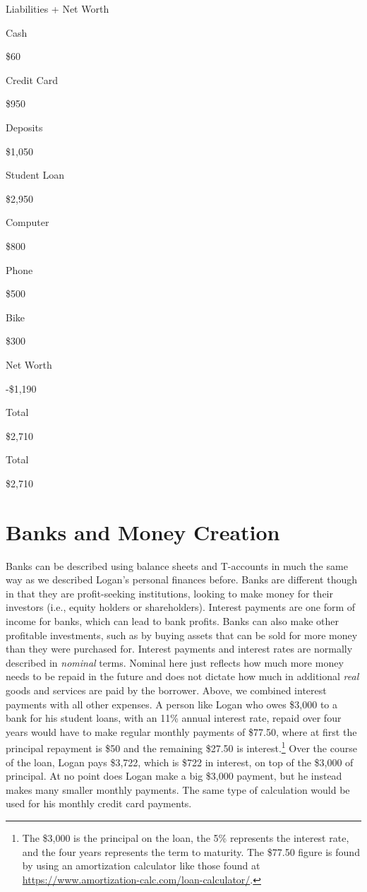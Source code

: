 \documentclass[
]{book}
\begin{document}
Liabilities + Net Worth

Cash

\$60

Credit Card

\$950

Deposits

\$1,050

Student Loan

\$2,950

Computer

\$800

Phone

\$500

Bike

\$300

Net Worth

-\$1,190

Total

\$2,710

Total

\$2,710

\hypertarget{banks-and-money-creation}{%
\section{Banks and Money Creation}\label{banks-and-money-creation}}

Banks can be described using balance sheets and T-accounts in much the same way as we described Logan's personal finances before. Banks are different though in that they are profit-seeking institutions, looking to make money for their investors (i.e., equity holders or shareholders). Interest payments are one form of income for banks, which can lead to bank profits. Banks can also make other profitable investments, such as by buying assets that can be sold for more money than they were purchased for. Interest payments and interest rates are normally described in \emph{nominal} terms. Nominal here just reflects how much more money needs to be repaid in the future and does not dictate how much in additional \emph{real} goods and services are paid by the borrower. Above, we combined interest payments with all other expenses. A person like Logan who owes \$3,000 to a bank for his student loans, with an 11\% annual interest rate, repaid over four years would have to make regular monthly payments of \$77.50, where at first the principal repayment is \$50 and the remaining \$27.50 is interest.\footnote{The \$3,000 is the principal on the loan, the 5\% represents the interest rate, and the four years represents the term to maturity. The \$77.50 figure is found by using an amortization calculator like those found at \url{https://www.amortization-calc.com/loan-calculator/}.} Over the course of the loan, Logan pays \$3,722, which is \$722 in interest, on top of the \$3,000 of principal. At no point does Logan make a big \$3,000 payment, but he instead makes many smaller monthly payments. The same type of calculation would be used for his monthly credit card payments.
\end{document}
